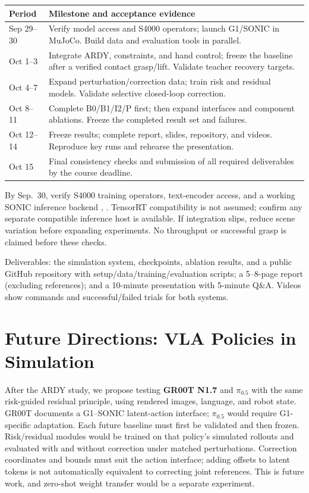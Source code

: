 \documentclass[11pt,a4paper]{article}
\begin{document}
\begingroup
\small
\renewcommand{\arraystretch}{1.12}
\begin{tabularx}{\linewidth}{@{}p{30mm}Y@{}}
\toprule
\textbf{Period} & \textbf{Milestone and acceptance evidence} \\
\midrule
Sep 29--30 & Verify model access and S4000 operators; launch G1/SONIC
in MuJoCo. Build data and evaluation tools in parallel. \\
Oct 1--3 & Integrate ARDY, constraints, and hand control; freeze the
baseline after a verified contact grasp/lift. Validate teacher recovery targets. \\
Oct 4--7 & Expand perturbation/correction data; train risk and residual
models. Validate selective closed-loop correction. \\
Oct 8--11 & Complete B0/B1/I2/P first; then expand interfaces and
component ablations. Freeze the completed result set and failures. \\
Oct 12--14 & Freeze results; complete report, slides, repository, and
videos. Reproduce key runs and rehearse the presentation. \\
Oct 15 & Final consistency checks and submission of all required
deliverables by the course deadline. \\
\bottomrule
\end{tabularx}
\endgroup

By Sep.~30, verify S4000 training operators, text-encoder access, and a working
SONIC inference backend \cite{ardycode}, \cite{soniccode}. TensorRT compatibility
is not assumed; confirm any separate compatible inference host is available.
If integration slips, reduce scene variation before expanding experiments.
No throughput or successful grasp is claimed before these checks.

Deliverables: the simulation system, checkpoints, ablation results, and a
public GitHub repository with setup/data/training/evaluation scripts; a
5--8-page report (excluding references); and a 10-minute presentation with
5-minute Q\&A. Videos show commands and successful/failed trials for both systems.

\newpage
\section{Future Directions: VLA Policies in Simulation}
After the ARDY study, we propose testing \textbf{GR00T N1.7} \cite{groot} and
\textbf{$\pi_{0.5}$} \cite{openpi} with the same risk-guided residual principle,
using rendered images, language, and robot state. GR00T documents a G1--SONIC
latent-action interface; $\pi_{0.5}$ would require G1-specific adaptation.
Each future baseline must first be validated and then frozen. Risk/residual
modules would be trained on that policy's simulated rollouts and evaluated
with and without correction under matched perturbations. Correction coordinates
and bounds must suit the action interface; adding offsets to latent tokens
is not automatically equivalent to correcting joint references. This is future
work, and zero-shot weight transfer would be a separate experiment.
\end{document}
